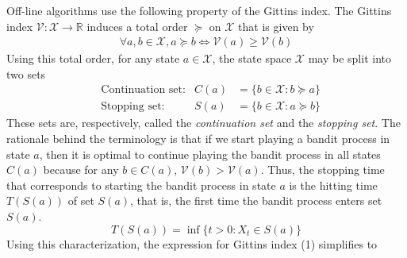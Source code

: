 \documentclass[11pt]{elegantbook}
\begin{document}
Off-line algorithms use the following property of the Gittins index. The Gittins
index $\mathcal{V}: \mathcal{X} \rightarrow \mathbb{R}$ induces a total order $\succeq$ on $\mathcal{X}$ that is given by
\begin{equation}
    \begin{aligned}
        \forall a,b\in \mathcal{X}, a\succeq b \Leftrightarrow \mathcal{V}(a)\geq \mathcal{V}(b)
    \end{aligned}
    \nonumber
\end{equation}
Using this total order, for any state $a\in \mathcal{X}$, the state space $\mathcal{X}$ may be split into two sets
\begin{equation}
    \begin{aligned}
        &\text{Continuation set:}&C(a)&=\{b\in \mathcal{X}:b\succeq a\}\\
        &\text{Stopping set:}&S(a)&=\{b\in \mathcal{X}:a\succeq b\}
    \end{aligned}
    \nonumber
\end{equation}
These sets are, respectively, called the \textit{continuation set} and the \textit{stopping set}. The rationale behind the terminology is that if
we start playing a bandit process in state $a$, then it is optimal to continue playing the bandit process in all states $C(a)$ because for any $b \in C(a)$, $\mathcal{V}(b) > \mathcal{V}(a)$. Thus, the stopping time that corresponds to starting the bandit process in state $a$ is the hitting time $T(S(a))$ of set $S(a)$, that is, the first time the bandit process enters set $S(a)$. $$T(S(a))=\inf\{t>0:X_t\in S(a)\}$$
Using this characterization, the expression for Gittins index (1) simplifies to
\end{document}
